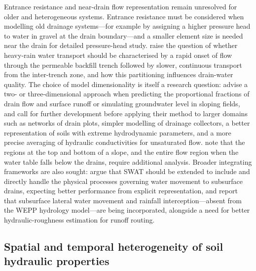 \documentclass[11pt]{article}
\begin{document}
Entrance resistance and near-drain flow representation remain unresolved for
older and heterogeneous systems. Entrance
resistance must be considered when modelling old drainage systems---for
example by assigning a higher pressure head to water in gravel at the drain
boundary---and a smaller element size is needed near the drain for
detailed pressure-head study. \textcite{Messing2006} raise the question of
whether heavy-rain water transport should be characterised by a rapid onset of
flow through the permeable backfill trench followed by slower, continuous
transport from the inter-trench zone, and how this partitioning influences
drain-water quality. The choice of model dimensionality is itself a research
question: \textcite{Alakukku2010} advise a two- or three-dimensional approach
when predicting the proportional fractions of drain flow and surface runoff or
simulating groundwater level in sloping fields, and \textcite{Carlier2007}
call for further development before applying their method to larger domains
such as networks of drain plots, simpler modelling of drainage collectors, a
better representation of soils with extreme hydrodynamic parameters, and a more
precise averaging of hydraulic conductivities for unsaturated flow.
\textcite{FIPPS1989} note that the regions at the top and bottom of a slope,
and the entire flow region when the water table falls below the drains, require
additional analysis. Broader integrating frameworks are also sought:
\textcite{Manguerra1998} argue that SWAT should be extended to include and
directly handle the physical processes governing water movement to subsurface
drains, expecting better performance from explicit representation, and
\textcite{SAVABI1993} report that subsurface lateral water movement and
rainfall interception---absent from the WEPP hydrology model---are being
incorporated, alongside a need for better hydraulic-roughness estimation for
runoff routing.

\subsection{Spatial and temporal heterogeneity of soil hydraulic properties}
\end{document}
